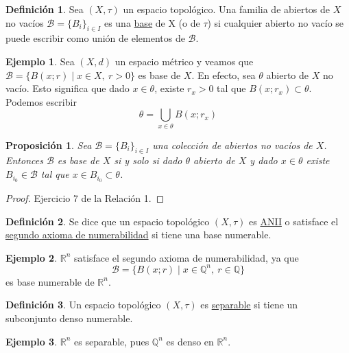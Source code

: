 \documentclass[12pt]{report}
\newtheorem{proposition}{Proposición}[chapter]
\theoremstyle{definition}
\newtheorem{definition}{Definición}[chapter]
\theoremstyle{definition}
\newtheorem{example}{Ejemplo}[chapter]
\theoremstyle{remark}
\newcommand{\R}{\mathbb R}
\newcommand{\Q}{\mathbb Q}
\begin{document}
\begin{definition}
Sea $(X,\tau)$ un espacio topológico. Una familia de abiertos de $X$ no vacíos $\mathcal{B} = \{B_i\}_{i \in I}$ es una \underline{base} de X (o de $\tau$) si cualquier abierto no vacío se puede escribir como unión de elementos de $\mathcal{B}$.
\end{definition}

\begin{example}
Sea $(X,d)$ un espacio métrico y veamos que $\mathcal{B} = \{B(x;r) \mid x \in X, \ r > 0\}$ es base de $X$. En efecto, sea $\theta$ abierto de $X$ no vacío. Esto significa que dado $x \in \theta$, existe $r_x > 0$ tal que $B(x;r_x) \subset \theta$. Podemos escribir \[\theta = \bigcup_{x \in \theta}B(x;r_x)\]
\end{example}

\begin{proposition}
Sea $\mathcal{B} = \{B_i\}_{i \in I}$ una colección de abiertos no vacíos de $X$. Entonces $\mathcal{B}$ es base de $X$ si y solo si dado $\theta$ abierto de $X$ y dado $x \in \theta$ existe $B_{i_0} \in \mathcal{B}$ tal que $x \in B_{i_0} \subset \theta$. 
\end{proposition}

\begin{proof}
Ejercicio 7 de la Relación 1.
\end{proof}

\vspace{2mm}
\begin{definition}
Se dice que un espacio topológico $(X,\tau)$ es \underline{ANII} o satisface el \ul{segundo axioma de numerabilidad} si tiene una base numerable.
\end{definition}

\begin{example}
$\R^n$ satisface el segundo axioma de numerabilidad, ya que \[\mathcal{B} = \{B(x;r) \mid x \in \Q^n, \ r \in \Q\}\] es base numerable de $\R^n$.
\end{example}

\vspace{2mm}
\begin{definition}
Un espacio topológico $(X,\tau)$ es \underline{separable} si tiene un subconjunto denso numerable.
\end{definition}

\begin{example}
$\R^n$ es separable, pues $\Q^n$ es denso en $\R^n$.
\end{example}
\end{document}
